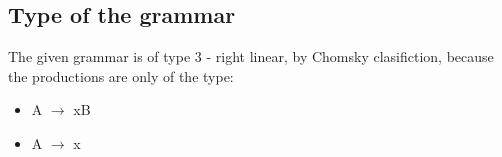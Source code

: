 \documentclass{article}
\begin{document}
	\subsection{Type of the grammar}
			The given grammar is of type 3 - right linear, by Chomsky
		clasifiction, because the productions are only of the type:

		\begin{center}
			\begin{itemize}
				\centering

				\item A $\rightarrow$ xB
				\item A $\rightarrow$ x
			\end{itemize}
		\end{center}

		\pagebreak
\end{document}
